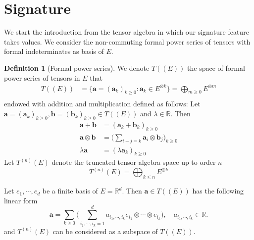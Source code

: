 \documentclass[12pt]{report}
\theoremstyle{definition}
\newtheorem{definition}[theorem]{Definition}
\theoremstyle{remark}
\newcommand{\R}{\mathbb{R}}
\begin{document}
\section{Signature}
We start the introduction from the tensor algebra in which our signature feature takes values. We consider the non-commuting formal power series of tensors with formal indeterminates as basis of $E$. 
\begin{definition}[Formal power series]
  We denote $T((E))$ the space of formal power series of tensors in $E$ that 
  \begin{equation}
    \begin{split}
      T((E)) &= \Bigg\{\mathbf{a} = (\mathbf{a}_{k})_{k\geq 0} \colon \mathbf{a}_{k} \in E^{\otimes k}\Bigg\} = \bigoplus_{m\geq 0} E^{\otimes m} \\
    \end{split}
  \end{equation}
  endowed with addition and multiplication defined as follows: Let $\mathbf{a} = (\mathbf{a}_{k})_{k\geq 0}, \mathbf{b} = (\mathbf{b}_{k})_{k\geq 0} \in T((E))$ and $\lambda \in \R$. Then 
\begin{equation}
  \begin{split}
    \mathbf{a} + \mathbf{b} &= (\mathbf{a}_{k} + \mathbf{b}_{k})_{k\geq 0}\\
    \mathbf{a} \otimes \mathbf{b} &= \big(\sum_{i+j = k}\mathbf{a}_{i} \otimes \mathbf{b}_{j}\big)_{k\geq 0}\\
    \lambda\mathbf{a} &= (\lambda \mathbf{a}_{k})_{k\geq 0}
  \end{split}
\end{equation}
Let $T^{(n)}(E)$ denote the truncated tensor algebra space up to order $n$
\begin{equation}
  T^{(n)}(E) = \bigoplus_{k\leq n} E^{\otimes k}
\end{equation}  
\end{definition}
Let $e_{1},\cdots,e_{d}$ be a finite basis of $E = \R^{d}$. Then $\mathbf{a}\in T((E))$ has the following linear form
\begin{equation} 
  \mathbf{a} = \sum_{k\geq 0}\Big(\sum_{i_{1},\cdots,i_{k} = 1}^{d} a_{i_{1},\cdots,i_{k}}e_{i_{1}}\otimes\cdots\otimes e_{i_{k}} \Big),\quad a_{i_{1},\cdots,i_{k}} \in \R.
\end{equation}
and $T^{(n)}(E)$ can be considered as a subspace of $T((E))$.
\end{document}
